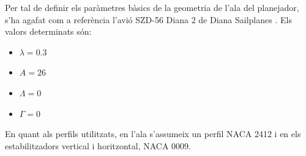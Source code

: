 Per tal de definir els paràmetres bàsics de la geometria de l'ala del planejador, s'ha agafat com a referència l'avió SZD-56 Diana 2 de Diana Sailplanes \cite{Kubrynski2006}. Els valors determinats són:
\begin{itemize}
	\item $\lambda=0.3$
	\item $A=26$
	\item $\Lambda=0$
	\item $\Gamma=0$
\end{itemize}


En quant als perfils utilitzats, en l'ala s'assumeix un perfil NACA 2412 i en els estabilitzadors vertical i horitzontal, NACA 0009.